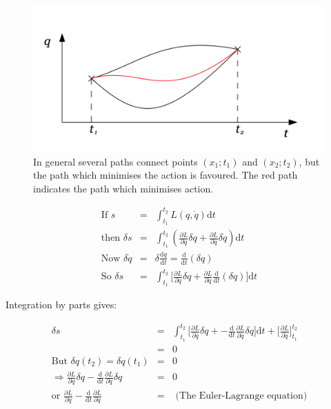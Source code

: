 \begin{figure}[!htb]
  \begin{center}
    \includegraphics[width=\textwidth]{images/chapter_4/action2.pdf}
    \caption[Schematic diagram showing action]{In general several paths connect points $(x_1;t_1)$ and $(x_2;t_2)$, but the path which minimises the action is favoured.  The red path indicates the path which minimises action.}
    \label{fig:ch4_action}
  \end{center}
\end{figure}

\begin{eqnarray*}
  \textrm{If }                s & = & \int_{t_1}^{t_2}L(q,\dot{q})\mathrm{d}t \\
  \textrm{then }       \delta s & = & \int_{t_1}^{t_2}\left( \frac{\partial L}{\partial q}\delta q + \frac{\partial L}{\partial \dot{q}}\delta \dot{q}\right) \mathrm{d}t \\
  \textrm{Now }  \delta \dot{q} & = & \delta \frac{\mathrm{d}q}{\mathrm{d}t} = \frac{\mathrm{d}}{\mathrm{d}t}\left( \delta q \right) \\
  \textrm{So }         \delta s & = & \int_{t_1}^{t_2}\Bigg[ \frac{\partial L}{\partial q}\delta q + \frac{\partial L}{\partial \dot{q}}\frac{\mathrm{d}}{\mathrm{d}t}\left(\delta q \right)\Bigg] \mathrm{d}t
\end{eqnarray*}

Integration by parts gives:

\begin{eqnarray*}
  \delta s & = & \int_{t_1}^{t_2}\Bigg[ \frac{\partial L}{\partial q}\delta q + - \frac{\mathrm{d}}{\mathrm{d}t}\frac{\partial L}{\partial \dot{q}}\delta q \Bigg] \mathrm{d}t + \Bigg[ \frac{\partial L}{\partial \dot{q}}\Bigg]_{t_1}^{t_2} \\
  & = & 0 \\
  \textrm{But } \delta q(t_2) = \delta q(t_1) & = & 0 \\
  \Rightarrow \frac{\partial L}{\partial q} \delta q - \frac{\mathrm{d}}{\mathrm{d}t}\frac{\partial L}{\partial \dot{q}}\delta q & = & 0 \\
  \textrm{or } \frac{\partial L}{\partial q} - \frac{\mathrm{d}}{\mathrm{d}t}\frac{\partial L}{\partial \dot{q}} & = & \textrm{ (The Euler-Lagrange equation)}
\end{eqnarray*}

